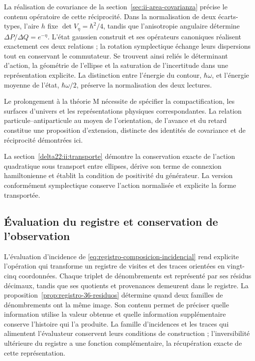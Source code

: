 La réalisation de covariance de la
section~\ref{sec:ii-area-covarianza} précise le contenu opératoire de
cette réciprocité. Dans la normalisation de deux écarts-types,
l'aire \(h\) fixe
\(\det V_\eta=\hbar^2/4\), tandis que l'anisotropie angulaire détermine
\(\Delta P/\Delta Q=e^{-\eta}\). L'état gaussien construit et ses
opérateurs canoniques réalisent exactement ces deux relations ; la
rotation symplectique échange leurs dispersions tout en conservant le
commutateur. Se trouvent ainsi reliés le déterminant d'action,
la géométrie de l'ellipse et la saturation de l'incertitude dans une
représentation explicite. La distinction entre l'énergie du contour,
\(\hbar\omega\), et l'énergie moyenne de l'état,
\(\hbar\omega/2\), préserve la normalisation des deux lectures.

Le prolongement à la théorie M nécessite de spécifier la compactification,
les surfaces d’univers et les représentations physiques correspondantes.
La relation particule--antiparticule au moyen de l’orientation, de l’avance et du
retard constitue une proposition d’extension, distincte des
identités de covariance et de réciprocité démontrées ici.

La section~\ref{delta22:ii:transporte} démontre la conservation exacte de l'action quadratique sous transport entre ellipses, dérive son terme de connexion hamiltonienne et établit la condition de positivité du générateur. La version conformément symplectique conserve l'action normalisée et explicite la forme transportée.

\subsection{Évaluation du registre et conservation de l'observation}

L’évaluation d’incidence de
\eqref{eq:registro-composicion-incidencial} rend explicite l’opération
qui transforme un registre de visites et des traces orientées en vingt-cinq
coordonnées. Chaque triplet de dénombrements est représenté par ses résidus
décimaux, tandis que ses quotients et provenances demeurent dans le registre.
La proposition~\ref{prop:registro-36-residuos} détermine quand deux
familles de dénombrements ont la même image. Son contenu permet de
préciser quelle information utilise la valeur obtenue et quelle information
supplémentaire conserve l’histoire qui l’a produite. La famille d’incidences
et les traces qui alimentent l’évaluateur conservent leurs conditions de
construction ; l’inversibilité ultérieure du registre a une fonction
complémentaire, la récupération exacte de cette représentation.

